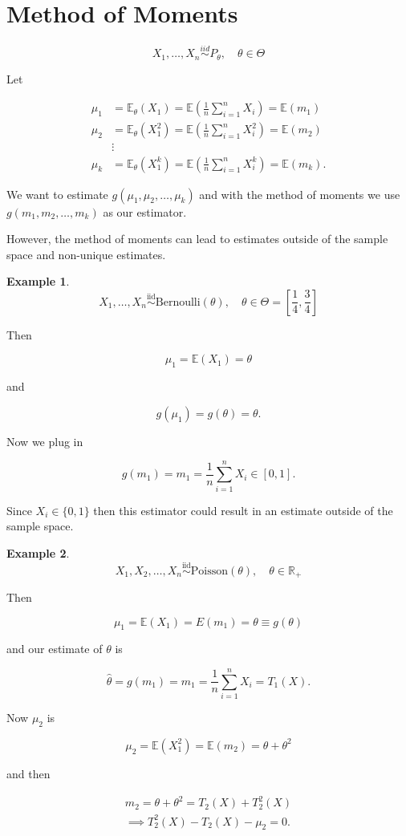 \documentclass[12pt]{article}
\theoremstyle{definition}
\newtheorem*{example}{Example}
\begin{document}
\section{Method of Moments}

$$ X_1, \ldots, X_n \overset{iid}{\sim} P_{\theta}, \quad \theta \in \Theta $$

Let

\begin{align*}
\mu_1 &= \mathbb{E}_{\theta}(X_1) = \mathbb{E} \left( \frac{1}{n} \sum_{i=1}^n X_i \right) = \mathbb{E}(m_1) \\
\mu_2 &= \mathbb{E}_{\theta}(X_1^2) = \mathbb{E} \left(\frac{1}{n} \sum_{i = 1}^n X^2_i \right) = \mathbb{E}(m_2) \\
&\vdots \\
\mu_k &= \mathbb{E}_{\theta}(X_1^k) = \mathbb{E} \left( \frac{1}{n} \sum_{i=1}^n X_i^k \right) = \mathbb{E}(m_k).
\end{align*}

We want to estimate $g(\mu_1, \mu_2, \ldots, \mu_k)$ and with the method of moments we use
$g(m_1, m_2, \ldots, m_k)$ as our estimator.

However, the method of moments can lead to estimates outside of the sample space and
non-unique estimates.

\begin{example}
$$ X_1, \ldots, X_n \overset{\text{iid}}{\sim} \text{Bernoulli}(\theta), \quad
\theta \in \Theta = \left[ \frac{1}{4}, \frac{3}{4} \right] $$

Then

$$ \mu_1 = \mathbb{E}(X_1) = \theta $$ 

and

$$ g(\mu_1) = g(\theta) = \theta. $$

Now we plug in 

$$ g(m_1) = m_1 = \frac{1}{n} \sum_{i=1}^n X_i \in [0,1]. $$

Since $X_i \in \{0, 1\}$ then this estimator could result
in an estimate outside of the sample space.
\end{example}


\begin{example}

$$X_1, X_2, \ldots, X_n \overset{\text{iid}}{\sim} \text{Poisson}(\theta), \quad \theta \in \mathbb{R}_+ $$ 

Then

$$ \mu_1 = \mathbb{E}(X_1) = E(m_1) = \theta \equiv g(\theta) $$

and our estimate of $\theta$ is

$$ \widehat{\theta} = g(m_1) = m_1 = \frac{1}{n} \sum_{i=1}^n X_i = T_1(X). $$

Now $\mu_2$ is

$$ \mu_2 = \mathbb{E}(X_1^2) = \mathbb{E}(m_2) = \theta + \theta^2 $$

and then

\begin{align*}
m_2 = \theta + \theta^2 = T_2(X) + T_2^2(X) \\
\implies T_2^2(X) - T_2(X) - \mu_2 = 0.
\end{align*} 

\end{example}
\end{document}
